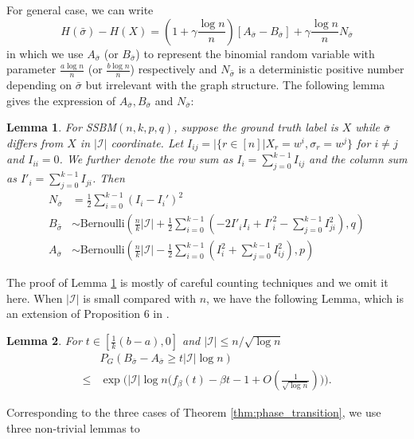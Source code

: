 \documentclass[journal]{IEEEtran}
\newtheorem{lemma}{Lemma}
\newcommand{\A}{\frac{a \log n}{n}}
\newcommand{\B}{\frac{b \log n}{n}}
\newcommand{\cI}{\mathcal{I}}
\newcommand{\1}{\mathbbm{1}}
\begin{document}
For general case, we can write
$$
H(\bar{\sigma}) - H(X)=
(1 + \gamma \frac{ \log n}{n})[A_{\bar{\sigma}} - B_{\bar{\sigma}}] + \gamma\frac{ \log n}{n} N_{\bar{\sigma}}
$$
in which we use $A_{\bar{\sigma}}$ (or $B_{\bar{\sigma}}$) to represent the binomial random variable with parameter $\A$ (or $\B$)
respectively and $N_{\bar{\sigma}}$ is a deterministic positive number depending on $\bar{\sigma}$ but irrelevant with the graph structure.
The following lemma gives the expression of $A_{\bar{\sigma}}, B_{\bar{\sigma}}$ and $N_{\bar{\sigma}}$:
\begin{lemma}\label{lem:minus}
	For SSBM$(n,k,p,q)$, suppose the ground truth label is $X$ while $\bar{\sigma}$ differs from $X$ in $|\cI|$ coordinate.
	Let $I_{ij} = |\{r\in [n] | X_r = w^i, \sigma_r = w^j \}$ for $i\neq j$ and $I_{ii} = 0$. We further denote the row sum as $I_i = \sum_{j=0}^{k-1} I_{ij}$ and
	the column sum as $I'_i = \sum_{j=0}^{k-1} I_{ji}$.
	Then
	\begin{align}
	N_{\bar{\sigma}} &= \frac{1}{2}\sum_{i=0}^{k-1} (I_i - I_i')^2 \label{eq:N_w} \\
	B_{\bar{\sigma}} & \sim \textrm{Bernoulli}(\frac{n}{k}|\cI| + \frac{1}{2}\sum_{i=0}^{k-1}  (-2 I'_i I_i  + I'^2_i - \sum_{j=0}^{k-1} I^2_{ji}) , q)\\
	A_{\bar{\sigma}} & \sim \textrm{Bernoulli}(\frac{n}{k}|\cI| - \frac{1}{2}\sum_{i=0}^{k-1}  (I^2_i + \sum_{j=0}^{k-1} I^2_{ij}), p) \label{eq:A_w}
	\end{align}
\end{lemma}
The proof of Lemma \ref{lem:minus} is mostly of careful counting techniques and we omit it here.
When $|\cI|$ is small compared with $n$, we have the following Lemma, which is an extension of Proposition 6 in \cite{ye2020exact}. 
\begin{lemma}\label{lem:enhanced_fb}
	For $t\in [\frac{1}{k}(b-a), 0]$
	and $ |\cI| \le n/\sqrt{\log n}$
	\begin{equation} \label{eq:upmpt}
	\begin{aligned}
	& P_G(B_{\bar{\sigma}}-A_{\bar{\sigma}}\ge t |\cI| \log n)  \\
	\le & \exp\Big(|\cI|\log n
	\Big(f_{\beta}(t) - \beta t -1	+ O(\frac{1}{\sqrt{\log n}}) \Big)\Big) .
	\end{aligned}
	\end{equation}
\end{lemma}
Corresponding to the three cases of Theorem \ref{thm:phase_transition}, we use three non-trivial lemmas to 
\end{document}
